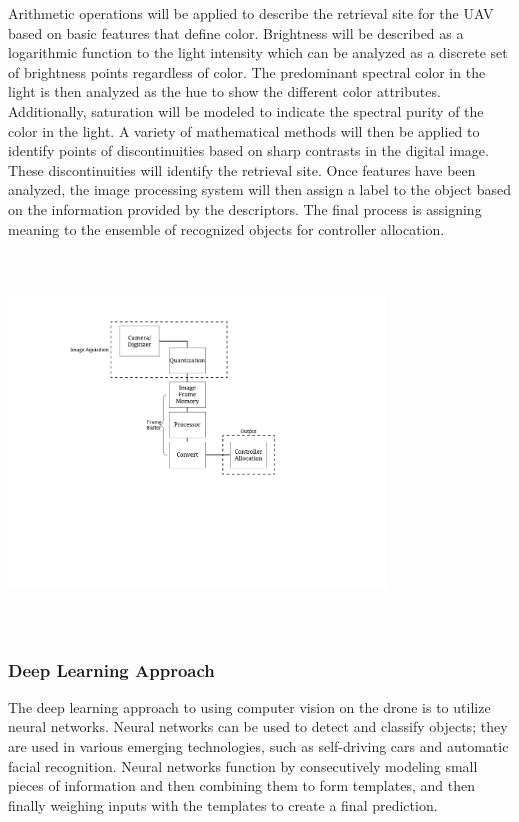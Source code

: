         Arithmetic operations will be applied to describe the retrieval site for the UAV based on basic features that define color. Brightness will be described as a logarithmic function to the light intensity which can be analyzed as a discrete set of brightness points regardless of color. The predominant spectral color in the light is then analyzed as the hue to show the different color attributes. Additionally, saturation will be modeled to indicate the spectral purity of the color in the light. A variety of mathematical methods will then be applied to identify points of discontinuities based on sharp contrasts in the digital image. These discontinuities will identify the retrieval site. Once features have been analyzed, the image processing system will then assign a label to the object based on the information provided by the descriptors. The final process is assigning meaning to the ensemble of recognized objects for controller allocation. 


\includegraphics[width = 10cm, height = 10cm]{img/PL/digital.pdf}

		\subsubsection{Deep Learning Approach}
			The deep learning approach to using computer vision on the drone is to utilize neural networks. Neural networks can be used to detect and classify objects; they are used in various emerging technologies, such as self-driving cars and automatic facial recognition. 
			Neural networks function by consecutively modeling small pieces of information and then combining them to form templates, and then finally weighing inputs with the templates to create a final prediction.
		
